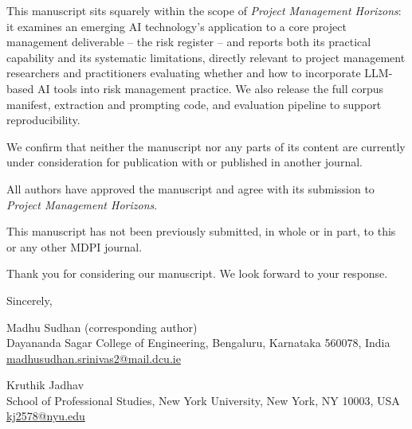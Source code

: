 \documentclass[11pt]{article}
\begin{document}
This manuscript sits squarely within the scope of \textit{Project Management Horizons}: it examines an emerging AI technology's application to a core project management deliverable -- the risk register -- and reports both its practical capability and its systematic limitations, directly relevant to project management researchers and practitioners evaluating whether and how to incorporate LLM-based AI tools into risk management practice. We also release the full corpus manifest, extraction and prompting code, and evaluation pipeline to support reproducibility.

We confirm that neither the manuscript nor any parts of its content are currently under consideration for publication with or published in another journal.

All authors have approved the manuscript and agree with its submission to \textit{Project Management Horizons}.

This manuscript has not been previously submitted, in whole or in part, to this or any other MDPI journal.

Thank you for considering our manuscript. We look forward to your response.

\newpage
\bigskip
Sincerely,

\bigskip
\noindent Madhu Sudhan (corresponding author)\\
Dayananda Sagar College of Engineering, Bengaluru, Karnataka 560078, India\\
\href{mailto:madhusudhan.srinivas2@mail.dcu.ie}{madhusudhan.srinivas2@mail.dcu.ie}

\bigskip
\noindent Kruthik Jadhav\\
School of Professional Studies, New York University, New York, NY 10003, USA\\
\href{mailto:kj2578@nyu.edu}{kj2578@nyu.edu}
\end{document}
